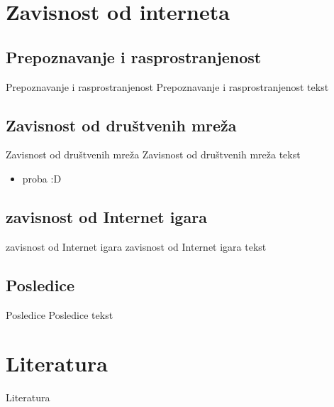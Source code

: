 \documentclass{beamer}
\begin{document}
\section{Zavisnost od interneta}
	\subsection*{Prepoznavanje i rasprostranjenost}
	\begin{frame}{Prepoznavanje i rasprostranjenost}
			Prepoznavanje i rasprostranjenost tekst
	\end{frame}

	\subsection*{Zavisnost od društvenih mreža}
		\begin{frame}{Zavisnost od društvenih mreža}
		Zavisnost od društvenih mreža tekst
			\begin{itemize}
			\item proba :D
			\end{itemize}
		\end{frame}
	\subsection*{zavisnost od Internet igara}
	\begin{frame}{zavisnost od Internet igara}
		zavisnost od Internet igara tekst
	\end{frame}
	
	\subsection*{Posledice}
	\begin{frame}{Posledice}
		Posledice tekst
	\end{frame}
	

\section{Literatura}

\begin{frame}{Literatura}



\end{frame}
\end{document}
